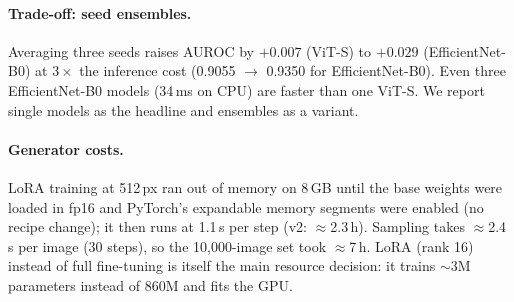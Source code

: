\documentclass[11pt,a4paper]{article}
\begin{document}
\paragraph{Trade-off: seed ensembles.} Averaging three seeds raises AUROC by $+0.007$ (ViT-S) to $+0.029$ (EfficientNet-B0) at $3\times$ the inference cost (0.9055 $\rightarrow$ 0.9350 for EfficientNet-B0). Even three EfficientNet-B0 models (34\,ms on CPU) are faster than one ViT-S. We report single models as the headline and ensembles as a variant.

\paragraph{Generator costs.} LoRA training at 512\,px ran out of memory on 8\,GB until the base weights were loaded in fp16 and PyTorch's expandable memory segments were enabled (no recipe change); it then runs at 1.1\,s per step (v2: $\approx$2.3\,h). Sampling takes $\approx$2.4\,s per image (30 steps), so the 10{,}000-image set took $\approx$7\,h. LoRA (rank 16) instead of full fine-tuning is itself the main resource decision: it trains $\sim$3M parameters instead of 860M and fits the GPU.
\end{document}
